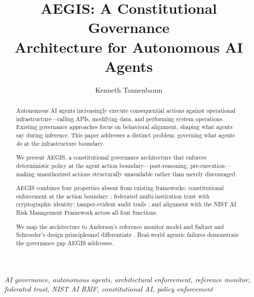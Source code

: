 \documentclass{IEEEcsmag}
\begin{document}

\title{AEGIS\deleted{\texttrademark}: A Constitutional Governance\\Architecture for Autonomous AI Agents}

\author{Kenneth Tannenbaum}


\begin{abstract}
Autonomous AI agents increasingly execute consequential actions against operational infrastructure---calling APIs, modifying data, and performing system operations. Existing governance approaches focus on behavioral alignment, shaping what agents say during inference. This paper addresses a distinct problem: governing what agents {\it do} at the infrastructure boundary.

We present AEGIS, a constitutional governance architecture that enforces deterministic policy at the agent action boundary---post-reasoning, pre-execution---making unauthorized actions structurally unavailable rather than merely discouraged.

AEGIS combines four properties absent from existing frameworks: constitutional enforcement at the action boundary ; federated multi-institution trust with cryptographic identity; tamper-evident audit trails ; and alignment with the NIST AI Risk Management Framework across all four functions.

We map the architecture to Anderson's reference monitor model and Saltzer and Schroeder's design principlesand differentiate . Real-world agentic failures demonstrate the governance gap AEGIS addresses.
\end{abstract}

\maketitle
\vspace*{-8pt}
 {\it AI governance, autonomous agents, architectural enforcement, reference monitor, federated trust, NIST AI RMF, constitutional AI, policy enforcement}\vspace{12pt}
\end{document}
